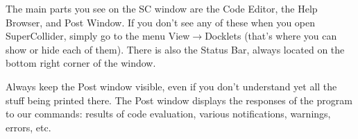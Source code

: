 The main parts you see on the SC window are the Code Editor, the Help Browser, and Post Window. If you don't see any of these when you open SuperCollider, simply go to the menu View$\rightarrow$Docklets (that's where you can show or hide each of them). There is also the Status Bar, always located on the bottom right corner of the window.

Always keep the Post window visible, even if you don't understand yet all the stuff being printed there. The Post window displays the responses of the program to our commands: results of code evaluation, various notifications, warnings, errors, etc.


